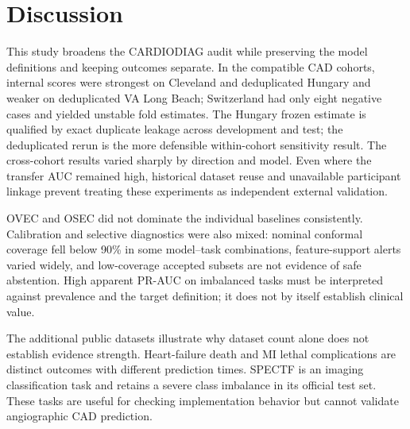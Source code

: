 \documentclass[conference]{IEEEtran}
\begin{document}
\begin{table}[t]
\centering
\caption{Matched OSEC fixed-default versus inner-tuned meta-estimator $C$. Deltas are fixed minus tuned; negative AUC and positive Brier differences favor the tuned condition. Hungary and VA use duplicate-safe partitions; SPECTF is one official test estimate.}
\label{tab:osec-tuning}
\scriptsize

\end{table}

\section{Discussion}
This study broadens the CARDIODIAG audit while preserving the model definitions and keeping outcomes separate. In the compatible CAD cohorts, internal scores were strongest on Cleveland and deduplicated Hungary and weaker on deduplicated VA Long Beach; Switzerland had only eight negative cases and yielded unstable fold estimates. The Hungary frozen estimate is qualified by exact duplicate leakage across development and test; the deduplicated rerun is the more defensible within-cohort sensitivity result. The cross-cohort results varied sharply by direction and model. Even where the transfer AUC remained high, historical dataset reuse and unavailable participant linkage prevent treating these experiments as independent external validation.

OVEC and OSEC did not dominate the individual baselines consistently. Calibration and selective diagnostics were also mixed: nominal conformal coverage fell below 90\% in some model--task combinations, feature-support alerts varied widely, and low-coverage accepted subsets are not evidence of safe abstention. High apparent PR-AUC on imbalanced tasks must be interpreted against prevalence and the target definition; it does not by itself establish clinical value.

The additional public datasets illustrate why dataset count alone does not establish evidence strength. Heart-failure death and MI lethal complications are distinct outcomes with different prediction times. SPECTF is an imaging classification task and retains a severe class imbalance in its official test set. These tasks are useful for checking implementation behavior but cannot validate angiographic CAD prediction.
\end{document}
